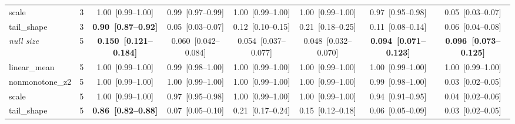 \begin{table}[t]
{\begin{tabular}{llcccccc}
scale & 3 & 1.00~[0.99--1.00] & 0.99~[0.97--0.99] & 1.00~[0.99--1.00] & 1.00~[0.99--1.00] & 0.97~[0.95--0.98] & 0.05~[0.03--0.07] \\
tail\_shape & 3 & \textbf{0.90~[0.87--0.92]} & 0.05~[0.03--0.07] & 0.12~[0.10--0.15] & 0.21~[0.18--0.25] & 0.11~[0.08--0.14] & 0.06~[0.04--0.08] \\
\midrule
\emph{null size} & 5 & \textbf{0.150~[0.121--0.184]} & 0.060~[0.042--0.084] & 0.054~[0.037--0.077] & 0.048~[0.032--0.070] & \textbf{0.094~[0.071--0.123]} & \textbf{0.096~[0.073--0.125]} \\
linear\_mean & 5 & 1.00~[0.99--1.00] & 0.99~[0.98--1.00] & 1.00~[0.99--1.00] & 1.00~[0.99--1.00] & 1.00~[0.99--1.00] & 1.00~[0.99--1.00] \\
nonmonotone\_z2 & 5 & 1.00~[0.99--1.00] & 1.00~[0.99--1.00] & 1.00~[0.99--1.00] & 1.00~[0.99--1.00] & 0.99~[0.98--1.00] & 0.03~[0.02--0.05] \\
scale & 5 & 1.00~[0.99--1.00] & 0.97~[0.95--0.98] & 1.00~[0.99--1.00] & 1.00~[0.99--1.00] & 0.94~[0.91--0.95] & 0.04~[0.02--0.06] \\
tail\_shape & 5 & \textbf{0.86~[0.82--0.88]} & 0.07~[0.05--0.10] & 0.21~[0.17--0.24] & 0.15~[0.12--0.18] & 0.06~[0.05--0.09] & 0.03~[0.02--0.05] \\
\bottomrule
\end{tabular}}
\end{table}
